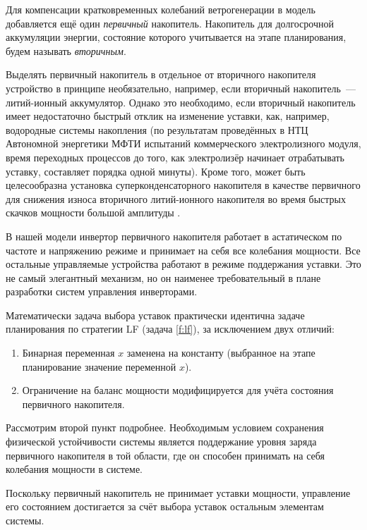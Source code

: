     
    Для компенсации кратковременных колебаний ветрогенерации в модель добавляется ещё один \textit{первичный} накопитель.
    Накопитель для долгосрочной аккумуляции энергии, состояние которого учитывается на этапе планирования, будем называть \textit{вторичным}.
    
    Выделять первичный накопитель в отдельное от вторичного накопителя устройство в принципе необязательно, например, если вторичный накопитель~--- литий-ионный аккумулятор.
    Однако это необходимо, если вторичный накопитель имеет недостаточно быстрый отклик на изменение уставки, как, например, водородные системы накопления (по результатам проведённых в НТЦ Автономной энергетики МФТИ испытаний коммерческого электролизного модуля, время переходных процессов до того, как электролизёр начинает отрабатывать уставку, составляет порядка одной минуты).
    Кроме того, может быть целесообразна установка суперконденсаторного накопителя в качестве первичного для снижения износа вторичного литий-ионного накопителя во время быстрых скачков мощности большой амплитуды \cite{mendis2013management, ju2017two}.
    
    В нашей модели инвертор первичного накопителя работает в астатическом по частоте и напряжению режиме и принимает на себя все колебания мощности.
    Все остальные управляемые устройства работают в режиме поддержания уставки.
    Это не самый элегантный механизм, но он наименее требовательный в плане разработки систем управления инверторами.
    
    Математически задача выбора уставок практически идентична задаче планирования по стратегии LF (задача \ref{f:lf}), за исключением двух отличий:
    \begin{enumerate}
        \item Бинарная переменная $x$  заменена на константу (выбранное на этапе планирование значение переменной $x$).  
        
        \item  Ограничение на баланс мощности модифицируется для учёта состояния первичного накопителя.
    \end{enumerate}
    
    Рассмотрим второй пункт подробнее.
    Необходимым условием сохранения физической устойчивости системы является поддержание уровня заряда первичного накопителя в той области, где он способен принимать на себя колебания мощности в системе.
    
    Поскольку первичный накопитель не принимает уставки мощности, управление его состоянием достигается за счёт выбора уставок остальным элементам системы. 
    
